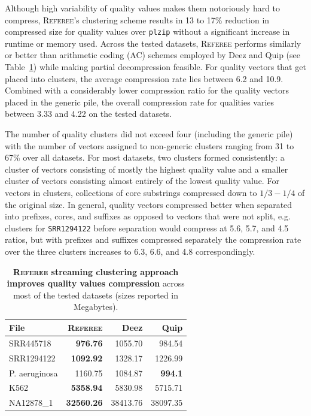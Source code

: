 \documentclass[12pt]{cmuthesis}
\newcommand{\refer}{\textsc{Referee}\xspace}
\begin{document}
  Although high variability of quality values makes them notoriously hard to compress, \refer's clustering scheme results in 13 to 17\% reduction in compressed size for quality values over \texttt{plzip} without a significant increase in runtime or memory used. Across the tested datasets, \refer performs similarly or better than arithmetic coding (AC) schemes employed by Deez and Quip (see Table~\ref{tab:qual-compression}) while making partial decompression feasible.
  For quality vectors that get placed into clusters, the average compression rate lies between 6.2 and 10.9. Combined with a considerably lower compression ratio for the quality vectors placed in the generic pile, the overall compression rate for qualities varies between 3.33 and 4.22 on the tested datasets.

  The number of quality clusters did not exceed four (including the generic pile) with the number of vectors assigned to non-generic clusters ranging from 31 to 67\% over all datasets. For most datasets, two clusters formed consistently: a cluster of vectors consisting of mostly the highest quality value and a smaller cluster of vectors consisting almost entirely of the lowest quality value. For vectors in clusters, collections of core substrings compressed down to $1/3 - 1/4$ of the original size. In general, quality vectors compressed better when separated into prefixes, cores, and suffixes as opposed to vectors that were not split, e.g. clusters for \texttt{SRR1294122} before separation would compress at 5.6, 5.7, and 4.5 ratios, but with prefixes and suffixes compressed separately the compression rate over the three clusters increases to 6.3, 6.6, and 4.8 correspondingly.

  \begin{table}[ht!]
    \caption{\textbf{\refer streaming clustering approach improves quality values compression} across most of the tested datasets (sizes reported in Megabytes).}
    \label{tab:qual-compression}
    \centering
    \begin{tabular}{l r r r}
    \toprule
    File & \refer & Deez & Quip \\
    \midrule
    SRR445718 	& \textbf{976.76} & 1055.70 & 984.54 \\
    SRR1294122 	& \textbf{1092.92} & 1328.17 & 1226.99 \\
    P. aeruginosa & 1160.75 & 1084.87 & \textbf{994.1} \\
    K562 		& \textbf{5358.94} & 5830.98 & 5715.71 \\
    NA12878\_1 	& \textbf{32560.26} & 38413.76 & 38097.35 \\
    \bottomrule
    \end{tabular}
  \end{table}
\end{document}
